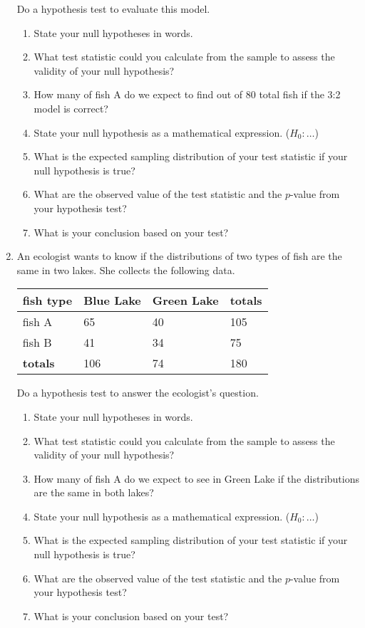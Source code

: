 \documentclass[12pt,fullpage]{amsart}
\begin{document}
\begin{enumerate}
Do a hypothesis test to evaluate this model.
\begin{enumerate}
\item State your null hypotheses in words. 
  \item What test statistic could you calculate from the sample to assess the validity of your null hypothesis?
  \item How many of fish A do we expect to find out of 80 total fish if the 3:2 model is correct?
    \item State your null hypothesis as a mathematical expression. ($H_0: \ldots$)
    \item What is the expected sampling distribution of your test statistic if your null hypothesis is true? 
  \item What are the observed value of the test statistic and the $p$-value from your hypothesis test?
\item What is your conclusion based on your test?
  \end{enumerate}

\vfill

\item An ecologist wants to know if the distributions of two types of fish are the same in two lakes. She collects the following data.

\begin{center}
\begin{tabular}{llll}
\textbf{fish type} & \textbf{Blue Lake} & \textbf{Green Lake} & \textbf{totals}\\
\hline
fish A & 65 & 40 & 105\\
fish B & 41 & 34 & 75\\
\hline
\textbf{totals} & 106 & 74 & 180
\end{tabular}
\end{center}

Do a hypothesis test to answer the ecologist's question.
\begin{enumerate}
\item State your null hypotheses in words. 
  \item What test statistic could you calculate from the sample to assess the validity of your null hypothesis?
  \item How many of fish A do we expect to see in Green Lake if the distributions are the same in both lakes?
    \item State your null hypothesis as a mathematical expression. ($H_0: \ldots$)
    \item What is the expected sampling distribution of your test statistic if your null hypothesis is true? 
  \item What are the observed value of the test statistic and the $p$-value from your hypothesis test?
\item What is your conclusion based on your test?
\end{enumerate}


\end{enumerate}
\end{document}

